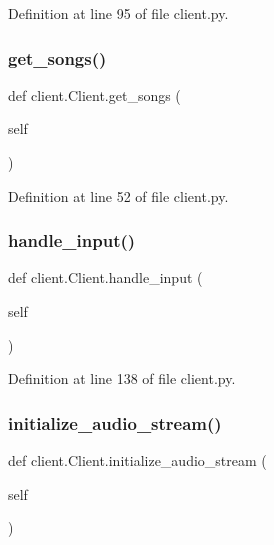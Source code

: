 Definition at line 95 of file client.\+py.

\mbox{\label{classclient_1_1_client_a3750b6fec748f30f7f743fd1ce6959ec}} 
\subsubsection{\texorpdfstring{get\_songs()}{get\_songs()}}
{\footnotesize\ttfamily def client.\+Client.\+get\+\_\+songs (\begin{DoxyParamCaption}\item[{}]{self }\end{DoxyParamCaption})}



Definition at line 52 of file client.\+py.

\mbox{\label{classclient_1_1_client_af2db73fbc5f326a580fd7996af13c698}} 
\subsubsection{\texorpdfstring{handle\_input()}{handle\_input()}}
{\footnotesize\ttfamily def client.\+Client.\+handle\+\_\+input (\begin{DoxyParamCaption}\item[{}]{self }\end{DoxyParamCaption})}



Definition at line 138 of file client.\+py.

\mbox{\label{classclient_1_1_client_a3b9a4e393333a884eae6783f272e6d64}} 
\subsubsection{\texorpdfstring{initialize\_audio\_stream()}{initialize\_audio\_stream()}}
{\footnotesize\ttfamily def client.\+Client.\+initialize\+\_\+audio\+\_\+stream (\begin{DoxyParamCaption}\item[{}]{self }\end{DoxyParamCaption})}



